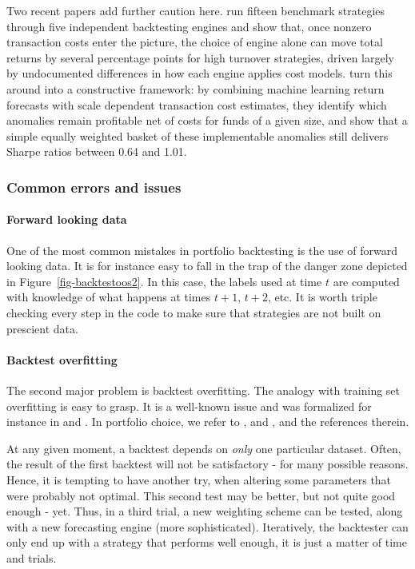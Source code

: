 Two recent papers add further caution here. \cite{yin2026implementation} run fifteen benchmark strategies through five independent backtesting engines and show that, once nonzero transaction costs enter the picture, the choice of engine alone can move total returns by several percentage points for high turnover strategies, driven largely by undocumented differences in how each engine applies cost models. \cite{beckmeyer2026reviving} turn this around into a constructive framework: by combining machine learning return forecasts with scale dependent transaction cost estimates, they identify which anomalies remain profitable net of costs for funds of a given size, and show that a simple equally weighted basket of these implementable anomalies still delivers Sharpe ratios between 0.64 and 1.01.

\subsubsection{Common errors and issues}

\paragraph{Forward looking data}

One of the most common mistakes in portfolio backtesting is the use of forward looking data. It is for instance easy to fall in the trap of the danger zone depicted in Figure~\ref{fig-backtestoos2}. In this case, the labels used at time $t$ are computed with knowledge of what happens at times $t+1$, $t+2$, etc. It is worth triple checking every step in the code to make sure that strategies are not built on prescient data.

\paragraph{Backtest overfitting}\label{backov}

The second major problem is backtest overfitting. The analogy with training set overfitting is easy to grasp. It is a well-known issue and was formalized for instance in \cite{white2000reality} and \cite{romano2005stepwise}. In portfolio choice, we refer to \cite{bajgrowicz2012technical}, \cite{bailey2014deflated} and \cite{lopez2020false}, and the references therein.

At any given moment, a backtest depends on \textit{only} one particular dataset. Often, the result of the first backtest will not be satisfactory - for many possible reasons. Hence, it is tempting to have another try, when altering some parameters that were probably not optimal. This second test may be better, but not quite good enough - yet. Thus, in a third trial, a new weighting scheme can be tested, along with a new forecasting engine (more sophisticated). Iteratively, the backtester can only end up with a strategy that performs well enough, it is just a matter of time and trials.


